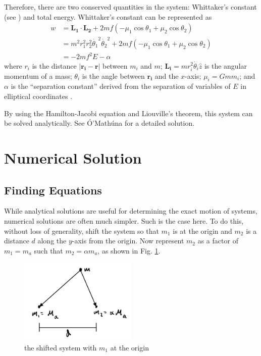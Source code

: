 \documentclass[preprint,titlepage,preprintnumbers,amsmath,amssymb,aps,11pt]{revtex4-2}
\begin{document}
Therefore, there are two conserved quantities in the system: Whittaker's constant (see \cite[p. 100]{Krishnaswami2019}) and total energy. Whittaker's constant can be represented as
\begin{equation}
    \begin{aligned}
        w & =\bm{L_1}\cdot\bm{L_2}+2mf(-\mu _1 \cos{\theta _1} +\mu _2 \cos{\theta _2})                           \\
          & =m^2r_1^2r_2^2\dot{\theta _1}^2\dot{\theta _2}^2+2mf(-\mu _1 \cos{\theta _1} +\mu _2 \cos{\theta _2}) \\
          & =-2mf^2E-\alpha
    \end{aligned}
\end{equation}
where $r_i$ is the distance $|\bm{r_i}-\bm{r}|$ between $m_i$ and $m$; $\bm{L_i}=mr_i^2\dot{\theta _i}\hat{z}$ is the angular momentum of a mass; $\theta _i$ is the angle between $\bm{r_i}$ and the $x$-axis; $\mu _i=Gmm_i$; and $\alpha$ is the “separation constant” derived from the separation of variables of $E$ in elliptical coordinates \cite[p. 101]{Krishnaswami2019}.

By using the Hamilton-Jacobi equation and Liouville's theorem, this system can be solved analytically. See Ó'Mathúna \cite[pages 49-105 and 113-142]{OMathuna2008} for a detailed solution.

\section{Numerical Solution}
\subsection{Finding Equations}
While analytical solutions are useful for determining the exact motion of systems, numerical solutions are often much simpler. Such is the case here.
To do this, without loss of generality, shift the system so that $m_1$ is at the origin and $m_2$ is a distance $d$ along the $y$-axis from the origin. Now represent $m_2$ as a factor of $m_1=m_a$ such that $m_2=\alpha m_a$, as shown in Fig. \ref{fig:shiftedsys}.
\begin{figure}
    \centering
    \includegraphics[width=0.5\textwidth]{Fig 3.jpeg}
    \caption{the shifted system with $m_1$ at the origin}
    \label{fig:shiftedsys}
\end{figure}
\end{document}
